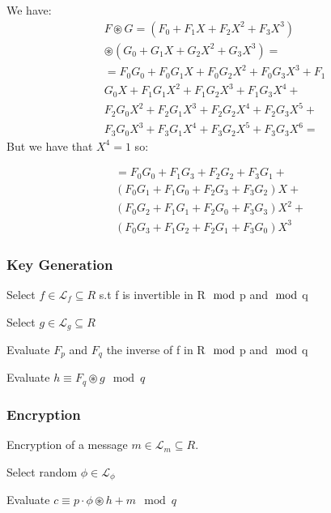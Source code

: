 \noindent
We have:
\begin{align*}
    &F \circledast G = (F_0 + F_1 X + F_2 X^2 + F_3 X^3)\\ 
    &\circledast (G_0 + G_1 X + G_2 X^2 + G_3 X^3) = \\
    &= F_0 G_0 + F_0 G_1 X + F_0 G_2 X^2 + F_0 G_3 X^3 + F_1 \\
    &G_0 X + F_1 G_1 X^2 + F_1 G_2 X^3 + F_1 G_3 X^4 + \\
    &F_2 G_0 X^2 + F_2 G_1 X^3 + F_2 G_2 X^4 + F_2 G_3 X^5 + \\
    &F_3 G_0 X^3 + F_3 G_1 X^4 + F_3 G_2 X^5 + F_3 G_3 X^6=
\end{align*}
\noindent
But we have that $X^4 = 1$ so:

\begin{align*}
    = F_0 G_0 + F_1 G_3 + F_2 G_2 + F_3 G_1 + \\
    (F_0 G_1 + F_1 G_0 + F_2 G_3 + F_3 G_2) X + \\
    (F_0 G_2 + F_1 G_1 + F_2 G_0 + F_3 G_3) X^2 + \\
    (F_0 G_3 + F_1 G_2 + F_2 G_1 + F_3 G_0) X^3
\end{align*}

\subsubsection{Key Generation}
\begin{algorithm}
\begin{algorithmic}[1]

    \State Select $f \in \mathcal{L}_f \subseteq R$ s.t f is invertible in R$\mod$p and$\mod$q

    \State Select $g \in \mathcal{L}_g \subseteq R$

    \State Evaluate $F_p$ and $F_q$ the inverse of f in R$\mod$p and$\mod$q

    \State Evaluate $h \equiv F_q \circledast g \mod q$

\end{algorithmic}
\end{algorithm}

\subsubsection{Encryption}
Encryption of a message $m \in \mathcal{L}_m \subseteq R$.

\begin{algorithm}
\begin{algorithmic}[1]

    \State Select random $\phi \in \mathcal{L}_\phi$

    \State Evaluate $c \equiv p \cdot \phi \circledast h + m \mod q$

\end{algorithmic}
\end{algorithm}

